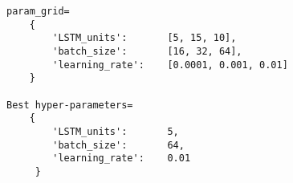 \begin{lstlisting}
param_grid=
    {
        'LSTM_units':       [5, 15, 10],
        'batch_size':       [16, 32, 64],
        'learning_rate':    [0.0001, 0.001, 0.01]
    }

Best hyper-parameters=
    {
        'LSTM_units':       5,
        'batch_size':       64, 
        'learning_rate':    0.01
     }
\end{lstlisting}
